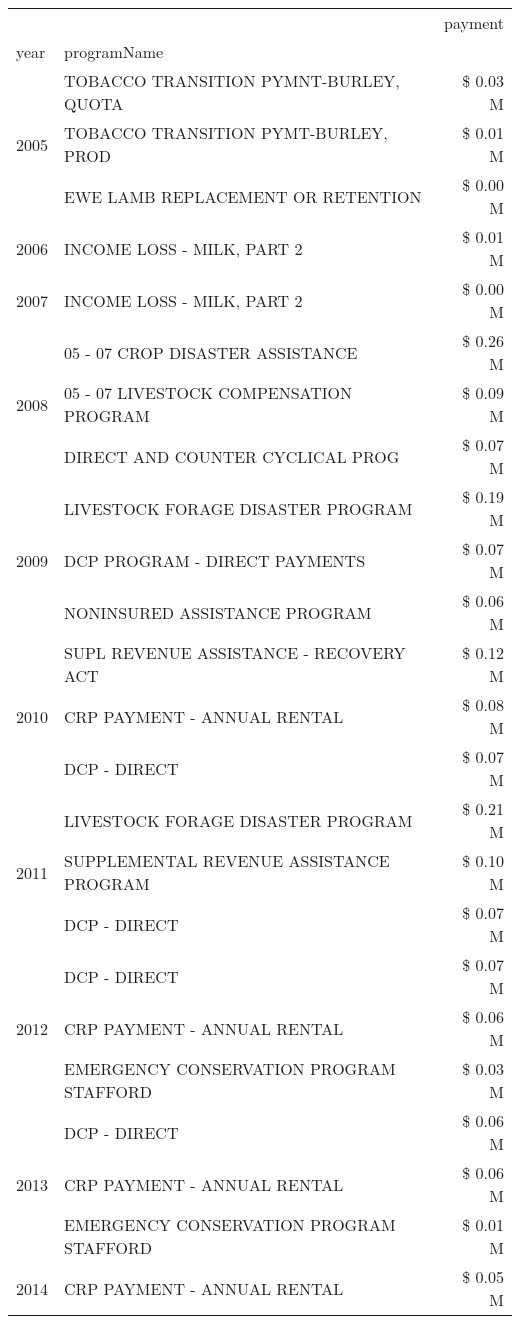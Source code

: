 \begin{tabular}{llr}
\toprule
 &  & payment \\
year & programName &  \\
\midrule
\multirow[t]{3}{*}{2005} & TOBACCO TRANSITION PYMNT-BURLEY, QUOTA & \$ 0.03 M \\
 & TOBACCO TRANSITION PYMT-BURLEY, PROD & \$ 0.01 M \\
 & EWE LAMB REPLACEMENT OR RETENTION & \$ 0.00 M \\
\cline{1-3}
2006 & INCOME LOSS - MILK, PART 2 & \$ 0.01 M \\
\cline{1-3}
2007 & INCOME LOSS - MILK, PART 2 & \$ 0.00 M \\
\cline{1-3}
\multirow[t]{3}{*}{2008} & 05 - 07 CROP DISASTER ASSISTANCE & \$ 0.26 M \\
 & 05 - 07 LIVESTOCK COMPENSATION PROGRAM & \$ 0.09 M \\
 & DIRECT AND COUNTER CYCLICAL PROG & \$ 0.07 M \\
\cline{1-3}
\multirow[t]{3}{*}{2009} & LIVESTOCK FORAGE DISASTER  PROGRAM & \$ 0.19 M \\
 & DCP PROGRAM - DIRECT PAYMENTS & \$ 0.07 M \\
 & NONINSURED ASSISTANCE PROGRAM & \$ 0.06 M \\
\cline{1-3}
\multirow[t]{3}{*}{2010} & SUPL REVENUE ASSISTANCE - RECOVERY ACT & \$ 0.12 M \\
 & CRP PAYMENT - ANNUAL RENTAL & \$ 0.08 M \\
 & DCP - DIRECT & \$ 0.07 M \\
\cline{1-3}
\multirow[t]{3}{*}{2011} & LIVESTOCK FORAGE DISASTER PROGRAM & \$ 0.21 M \\
 & SUPPLEMENTAL REVENUE ASSISTANCE PROGRAM & \$ 0.10 M \\
 & DCP - DIRECT & \$ 0.07 M \\
\cline{1-3}
\multirow[t]{3}{*}{2012} & DCP - DIRECT & \$ 0.07 M \\
 & CRP PAYMENT - ANNUAL RENTAL & \$ 0.06 M \\
 & EMERGENCY CONSERVATION PROGRAM STAFFORD & \$ 0.03 M \\
\cline{1-3}
\multirow[t]{3}{*}{2013} & DCP - DIRECT & \$ 0.06 M \\
 & CRP PAYMENT - ANNUAL RENTAL & \$ 0.06 M \\
 & EMERGENCY CONSERVATION PROGRAM STAFFORD & \$ 0.01 M \\
\cline{1-3}
\multirow[t]{3}{*}{2014} & CRP PAYMENT - ANNUAL RENTAL & \$ 0.05 M \\

\end{tabular}
